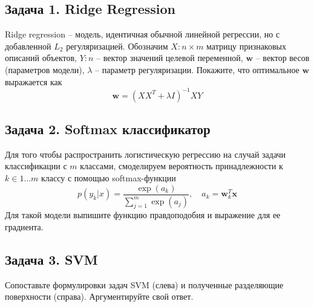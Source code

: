 \documentclass[12pt,a4paper]{article}
\author{Николай Анохин}
\begin{document}
\subsection*{Задача 1. Ridge Regression} 

Ridge regression -- модель, идентичная обычной линейной регрессии, но с добавленной $L_2$ регуляризацией. Обозначим $X: n \times m$ матрицу признаковых описаний объектов,  $Y: n$ --  вектор значений целевой переменной,  $\mathbf{w}$ -- вектор весов (параметров модели), $\lambda$ -- параметр регуляризации. Покажите, что оптимальное $\mathbf{w}$ выражается как
\[
\mathbf{w} = (X X^T + \lambda I)^{-1} X Y
\]

\subsection*{Задача 2. Softmax классификатор}

Для того чтобы распространить логистическую регрессию на случай задачи классификации с $m$ классами, смоделируем вероятность принадлежности к $k \in 1 \ldots m$ классу с помощью softmax-функции
\[
p(y_k | x) = \frac{\exp(a_k)}{\sum_{j=1}^m\exp(a_j)}, \quad a_k = \mathbf{w}_k^T \mathbf{x}
\]
Для такой модели выпишите функцию правдоподобия и выражение для ее градиента.

\subsection*{Задача 3. SVM}

Сопоставьте формулировки задач SVM (слева) и полученные разделяющие поверхности (справа). Аргументируйте свой ответ.
\end{document}
